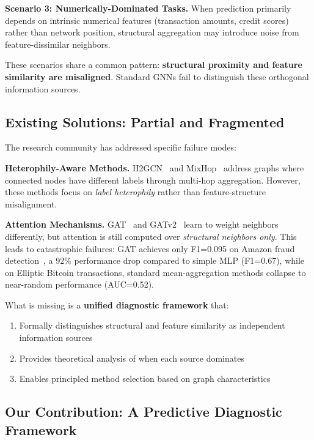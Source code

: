 \textbf{Scenario 3: Numerically-Dominated Tasks.} When prediction primarily depends on intrinsic numerical features (transaction amounts, credit scores) rather than network position, structural aggregation may introduce noise from feature-dissimilar neighbors.

These scenarios share a common pattern: \textbf{structural proximity and feature similarity are misaligned}. Standard GNNs fail to distinguish these orthogonal information sources.

\subsection{Existing Solutions: Partial and Fragmented}

The research community has addressed specific failure modes:

\textbf{Heterophily-Aware Methods.} H2GCN~\cite{zhu2020beyond} and MixHop~\cite{abu2019mixhop} address graphs where connected nodes have different labels through multi-hop aggregation. However, these methods focus on \textit{label heterophily} rather than feature-structure misalignment.

\textbf{Attention Mechanisms.} GAT~\cite{velivckovic2018gat} and GATv2~\cite{brody2022gatv2} learn to weight neighbors differently, but attention is still computed over \textit{structural neighbors only}. This leads to catastrophic failures: GAT achieves only F1=0.095 on Amazon fraud detection~\cite{dou2020enhancing}, a 92\% performance drop compared to simple MLP (F1=0.67), while on Elliptic Bitcoin transactions, standard mean-aggregation methods collapse to near-random performance (AUC=0.52).

What is missing is a \textbf{unified diagnostic framework} that:
\begin{enumerate}
    \item Formally distinguishes structural and feature similarity as independent information sources
    \item Provides theoretical analysis of when each source dominates
    \item Enables principled method selection based on graph characteristics
\end{enumerate}

\subsection{Our Contribution: A Predictive Diagnostic Framework}

